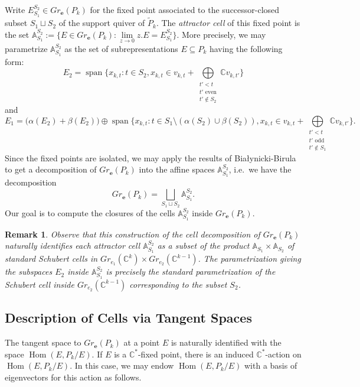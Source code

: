 \documentclass{amsart}
\newtheorem{remark}[theorem]{Remark}
\numberwithin{equation}{section}
\renewcommand{\AA}{\mathbb{A}}
\newcommand{\CC}{\mathbb{C}}
\newcommand{\bfe}{\mathbf{e}}
\newcommand{\Hom}{\operatorname{Hom}}
\newcommand{\Span}{\operatorname{span}}
\begin{document}
    Write $E_{S_1}^{S_2}\in Gr_\bfe(P_k)$ for the fixed point associated to the successor-closed subset $S_1\sqcup S_2$ of the support quiver of $\widetilde P_k$.
    The \emph{attractor cell} of this fixed point is the set $\AA_{S_1}^{S_2}:=\{ E\in Gr_\bfe(P_k) : \lim\limits_{z\to 0} z.E=E_{S_1}^{S_2} \}$.
    More precisely, we may parametrize $\AA_{S_1}^{S_2}$ as the set of subrepresentations $E\subseteq P_k$ having the following form:
    \[ E_2 = \Span\{x_{k,t}:t\in S_2, x_{k,t}\in v_{k,t}+\bigoplus\limits_{\substack{t'<t\\ \text{$t'$ even}\\ t'\notin S_2}} \CC v_{k,t'} \} \]
    and
    \[ E_1 = \big(\alpha(E_2)+\beta(E_2)\big)\oplus\Span\{x_{k,t}:t\in S_1\setminus(\alpha(S_2)\cup\beta(S_2)), x_{k,t}\in v_{k,t}+\bigoplus\limits_{\substack{t'<t\\ \text{$t'$ odd}\\ t'\notin S_1}} \CC v_{k,t'} \}. \]
    Since the fixed points are isolated, we may apply the results of Bia\l{}ynicki-Birula to get a decomposition of $Gr_\bfe(P_k)$ into the affine spaces $\AA_{S_1}^{S_2}$, i.e.\ we have the decomposition 
    \[Gr_\bfe(P_k)=\bigsqcup_{S_1\sqcup S_2} \AA_{S_1}^{S_2}.\]
    Our goal is to compute the closures of the cells $\AA_{S_1}^{S_2}$ inside $Gr_\bfe(P_k)$.
 
    \begin{remark}
      Observe that this construction of the cell decomposition of $Gr_\bfe(P_k)$ naturally identifies each attractor cell $\AA_{S_1}^{S_2}$ as a subset of the product $\AA_{S_1}\times \AA_{S_2}$ of standard Schubert cells in $Gr_{e_1}(\CC^k)\times Gr_{e_2}(\CC^{k-1})$.
      The parametrization giving the subspaces $E_2$ inside $\AA_{S_1}^{S_2}$ is precisely the standard parametrization of the Schubert cell inside $Gr_{e_2}(\CC^{k-1})$ corresponding to the subset $S_2$.
    \end{remark}
 
  \subsection{Description of Cells via Tangent Spaces}
    \label{sec:tangent parametrization}
    The tangent space to $Gr_\bfe(P_k)$ at a point $E$ is naturally identified with the space $\Hom(E,P_k/E)$.
    If $E$ is a $\CC^*$-fixed point, there is an induced $\CC^*$-action on $\Hom(E,P_k/E)$.
    In this case, we may endow $\Hom(E,P_k/E)$ with a basis of eigenvectors for this action as follows.
 
\end{document}
